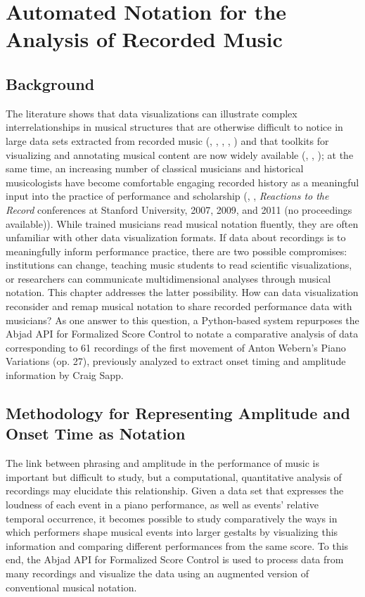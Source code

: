 \chapter{Automated Notation for the Analysis of Recorded Music}
\section{Background}
The literature shows that data visualizations can illustrate complex interrelationships in musical structures that are otherwise difficult to notice in large data sets extracted from recorded music (\cite{sapp2005visual}, \cite{kunze1996see}, \cite{mitroo1979movies}, \cite{sapp2011computational}, \cite{cook2007performance}) and that toolkits for visualizing and annotating musical content are now widely available (\cite{cannam2006sonic}, \cite{herrera2005mucosa}, \cite{marsden2007tools}); at the same time, an increasing number of classical musicians and historical musicologists have become comfortable engaging recorded history as a meaningful input into the practice of performance and scholarship (\cite{butt2002playing},  \cite{cook2010ghost}, \emph{Reactions to the Record} conferences at Stanford University, 2007, 2009, and 2011 (no proceedings available)). While trained musicians read musical notation fluently, they are often unfamiliar with other data visualization formats. If data about recordings is to meaningfully inform performance practice, there are two possible compromises: institutions can change, teaching music students to read scientific visualizations, or researchers can communicate multidimensional analyses through musical notation. This chapter addresses the latter possibility. How can data visualization reconsider and remap musical notation to share recorded performance data with musicians? As one answer to this question, a Python-based system repurposes the Abjad API for Formalized Score Control to notate a comparative analysis of data corresponding to 61 recordings of the first movement of Anton Webern’s Piano Variations (op. 27), previously analyzed to extract onset timing and amplitude information by Craig Sapp.

\section{Methodology for Representing Amplitude and Onset Time as Notation}

The link between phrasing and amplitude in the performance of music is important but difficult to study, but a computational, quantitative analysis of recordings may elucidate this relationship. Given a data set that expresses the loudness of each event in a piano performance, as well as events' relative temporal occurrence, it becomes possible to study comparatively the ways in which performers shape musical events into larger gestalts by visualizing this information and comparing different performances from the same score. To this end, the Abjad API for Formalized Score Control is used to process data from many recordings and visualize the data using an augmented version of conventional musical notation.

